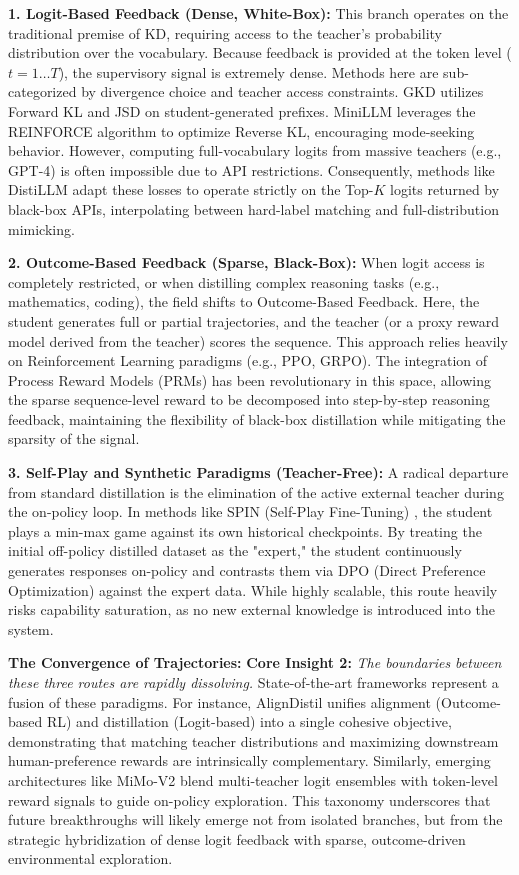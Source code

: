 \documentclass{article}
\begin{document}
\textbf{1. Logit-Based Feedback (Dense, White-Box):} 
This branch operates on the traditional premise of KD, requiring access to the teacher's probability distribution over the vocabulary. Because feedback is provided at the token level ($t=1 \dots T$), the supervisory signal is extremely dense. Methods here are sub-categorized by divergence choice and teacher access constraints. GKD \citep{2306.13649} utilizes Forward KL and JSD on student-generated prefixes. MiniLLM \citep{2306.08543} leverages the REINFORCE algorithm to optimize Reverse KL, encouraging mode-seeking behavior. However, computing full-vocabulary logits from massive teachers (e.g., GPT-4) is often impossible due to API restrictions. Consequently, methods like DistiLLM \citep{2402.03898} adapt these losses to operate strictly on the Top-$K$ logits returned by black-box APIs, interpolating between hard-label matching and full-distribution mimicking.

\textbf{2. Outcome-Based Feedback (Sparse, Black-Box):} 
When logit access is completely restricted, or when distilling complex reasoning tasks (e.g., mathematics, coding), the field shifts to Outcome-Based Feedback. Here, the student generates full or partial trajectories, and the teacher (or a proxy reward model derived from the teacher) scores the sequence. This approach relies heavily on Reinforcement Learning paradigms (e.g., PPO, GRPO). The integration of Process Reward Models (PRMs) \citep{2305.20050} has been revolutionary in this space, allowing the sparse sequence-level reward to be decomposed into step-by-step reasoning feedback, maintaining the flexibility of black-box distillation while mitigating the sparsity of the signal.

\textbf{3. Self-Play and Synthetic Paradigms (Teacher-Free):} 
A radical departure from standard distillation is the elimination of the active external teacher during the on-policy loop. In methods like SPIN (Self-Play Fine-Tuning) \citep{2401.01335}, the student plays a min-max game against its own historical checkpoints. By treating the initial off-policy distilled dataset as the "expert," the student continuously generates responses on-policy and contrasts them via DPO (Direct Preference Optimization) against the expert data. While highly scalable, this route heavily risks capability saturation, as no new external knowledge is introduced into the system.

\textbf{The Convergence of Trajectories:} 
\textbf{Core Insight 2:} \textit{The boundaries between these three routes are rapidly dissolving.} State-of-the-art frameworks represent a fusion of these paradigms. For instance, AlignDistil \citep{2503.02832} unifies alignment (Outcome-based RL) and distillation (Logit-based) into a single cohesive objective, demonstrating that matching teacher distributions and maximizing downstream human-preference rewards are intrinsically complementary. Similarly, emerging architectures like MiMo-V2 blend multi-teacher logit ensembles with token-level reward signals to guide on-policy exploration. This taxonomy underscores that future breakthroughs will likely emerge not from isolated branches, but from the strategic hybridization of dense logit feedback with sparse, outcome-driven environmental exploration.
\end{document}
